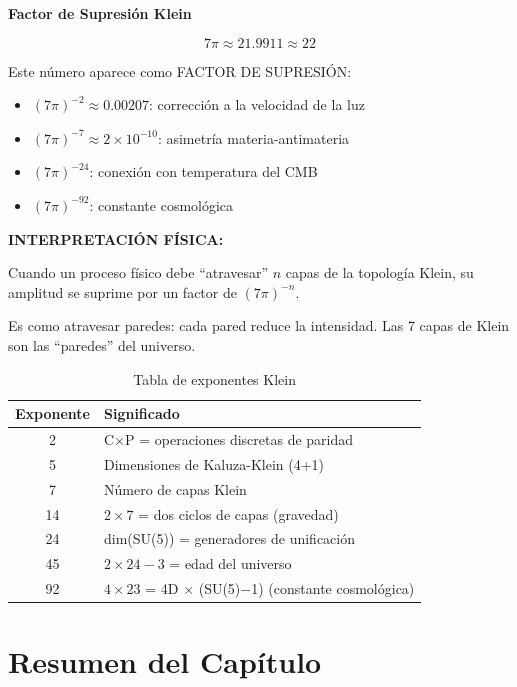 \begin{nivelconceptual}
\textbf{Factor de Supresión Klein}

\begin{equation}
\boxed{7\pi \approx 21.9911 \approx 22}
\end{equation}

Este número aparece como FACTOR DE SUPRESIÓN:

\begin{itemize}
    \item $(7\pi)^{-2} \approx 0.00207$: corrección a la velocidad de la luz
    \item $(7\pi)^{-7} \approx 2 \times 10^{-10}$: asimetría materia-antimateria
    \item $(7\pi)^{-24}$: conexión con temperatura del CMB
    \item $(7\pi)^{-92}$: constante cosmológica
\end{itemize}

\textbf{INTERPRETACIÓN FÍSICA:}

Cuando un proceso físico debe ``atravesar'' $n$ capas de la topología
Klein, su amplitud se suprime por un factor de $(7\pi)^{-n}$.

Es como atravesar paredes: cada pared reduce la intensidad.
Las 7 capas de Klein son las ``paredes'' del universo.
\end{nivelconceptual}

\begin{table}[H]
\centering
\caption{Tabla de exponentes Klein}
\begin{tabular}{cl}
\toprule
\textbf{Exponente} & \textbf{Significado} \\
\midrule
2 & C$\times$P = operaciones discretas de paridad \\
5 & Dimensiones de Kaluza-Klein (4+1) \\
7 & Número de capas Klein \\
14 & $2 \times 7$ = dos ciclos de capas (gravedad) \\
24 & dim(SU(5)) = generadores de unificación \\
45 & $2 \times 24 - 3$ = edad del universo \\
92 & $4 \times 23$ = 4D $\times$ (SU(5)$-$1) (constante cosmológica) \\
\bottomrule
\end{tabular}
\end{table}


\section{Resumen del Capítulo}


